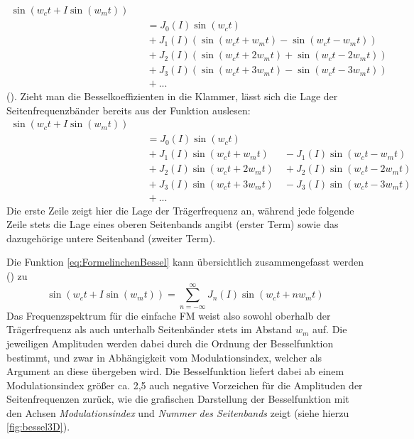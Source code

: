 \begin{equation}
\begin{split}
\sin(w_ct + I\sin(w_mt)) \\ &\quad = J_0(I)\sin(w_ct) \\ &\quad + J_1(I)(\sin(w_ct + w_mt) - \sin(w_ct - w_mt)) \\ &\quad + J_2(I)(\sin(w_ct + 2w_mt)+\sin(w_ct-2w_mt)) \\ &\quad  + J_3(I)(\sin(w_ct + 3w_mt) - \sin(w_ct - 3w_mt)) \\ &\quad  + ...
\end{split}
\end{equation}
(\cite[S.528]{chowningPaper}). Zieht man die Besselkoeffizienten in die Klammer, lässt sich die Lage der Seitenfrequenzbänder bereits aus der Funktion auslesen:
\begin{equation}\label{eq:FormelinchenBessel}
\begin{split}
\sin(w_ct + I\sin(w_mt)) \\ &\quad = J_0(I)\sin(w_ct) \\ &\quad + J_1(I)\sin(w_ct + w_mt) \quad\enspace - J_1(I)\sin(w_ct - w_mt) \\ &\quad + J_2(I)\sin(w_ct + 2w_mt) \quad + J_2(I)\sin(w_ct-2w_mt) \\ &\quad  + J_3(I)\sin(w_ct + 3w_mt) \quad - J_3(I)\sin(w_ct - 3w_mt) \\ &\quad  + ...
\end{split}
\end{equation}
Die erste Zeile zeigt hier die Lage der Trägerfrequenz an, während jede folgende Zeile stets die Lage eines oberen Seitenbands angibt (erster Term) sowie das dazugehörige untere Seitenband (zweiter Term). 

Die Funktion \ref{eq:FormelinchenBessel} kann übersichtlich zusammengefasst werden (\cite{schottiWeb}) zu 
\begin{equation}\label{esq:Besselbabymonster}
\sin(w_ct + I\sin(w_mt)) = \sum_{n=-\infty}^{\infty}J_n(I)\sin(w_ct+nw_mt)
\end{equation}
Das Frequenzspektrum für die einfache FM weist also sowohl oberhalb der Trägerfrequenz als auch unterhalb Seitenbänder stets im Abstand \begin{math} w_m \end{math} auf. Die jeweiligen Amplituden werden dabei durch die Ordnung der Besselfunktion bestimmt, und zwar in Abhängigkeit vom Modulationsindex, welcher als Argument an diese übergeben wird. Die Besselfunktion liefert dabei ab einem Modulationsindex größer ca. 2,5 auch negative Vorzeichen für die Amplituden der Seitenfrequenzen zurück, wie die grafischen Darstellung der Besselfunktion mit den Achsen \textit{Modulationsindex} und \textit{Nummer des Seitenbands} zeigt (siehe hierzu \ref{fig:bessel3D}). 

